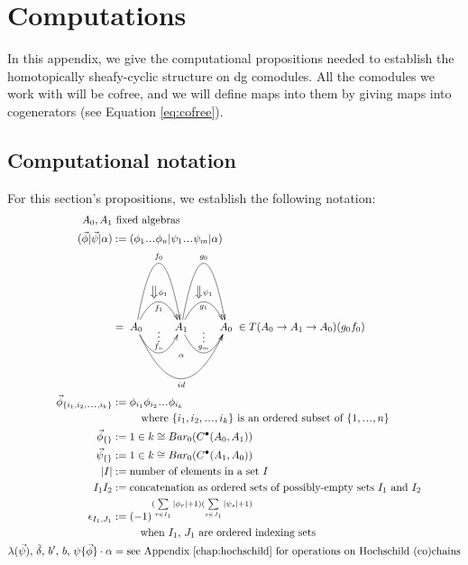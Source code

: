 \chapter{Computations}\label{chap:computations}
In this appendix, we give the 
computational propositions 
needed to establish the 
homotopically sheafy-cyclic structure 
on dg comodules. All the comodules we work 
with will be cofree, 
and we will define maps into them by 
giving maps into cogenerators 
(see Equation \ref{eq:cofree}).

\section{Computational notation} \label{sec:comp_notation_1}
For this section's propositions, we 
establish the following notation:
\begin{align*}
A_0, A_1 
&\textrm{ fixed algebras}\\
(\vec{\phi} | \vec{\psi} | \alpha) 
&:= 
(\phi_1\smdots\phi_n | \psi_1\smdots\psi_m| \alpha)\\
&= 
\xymatrix{
A_0 \ar@/^5pc/[r]^{f_0} 
\ar@/^2pc/[r]^{\big\Downarrow \phi_1}_{f_1} 
\ar@/_2pc/[r]^{\substack{\vdots\\ f_n}}
\ar@/_4pc/[rr]_{id}^{\substack{\alpha \\ \\ \\ \\ }}
& A_1 \ar@/^5pc/[r]^{g_0} 
\ar@/^2pc/[r]^{\big\Downarrow \psi_1}_{g_1} 
\ar@/_2pc/[r]^{\substack{\vdots\\ g_m}}
& A_0
}
\in T(A_0 \to A_1 \to A_0)(g_0f_0)\\
\vec{\phi}_{\{i_1, i_2,\smdots, i_k\}}
&:= 
\phi_{i_1}\phi_{i_2}\smdots\phi_{i_k}\\
&\phantom{{}move{}}
 \textrm{ where $\{i_1, i_2,\smdots, i_k\}$ 
 is an ordered subset of $\{1,\smdots,n\}$}\\
\vec{\phi}_{\{\}}
&:= 
1 \in k \cong Bar_0(C^\bullet(A_0, A_1))\\
\vec{\psi}_{\{\}}
&:= 
1 \in k \cong Bar_0(C^\bullet(A_1, A_0))\\
|I| 
&:=
\textrm{number of elements in a set $I$}\\
I_1I_2 
&:= 
\textrm{concatenation as ordered sets 
of possibly-empty sets $I_1$ and $I_2$}\\
\epsilon_{I_1,J_1} 
&:= 
(-1)^{(\sum \limits_{r \in I_1}|\phi_r|+1)
  (\sum \limits_{s \in J_1}|\psi_s|+1) }\\
&\phantom{{}:={}}  
  \quad \textrm{when $I_1$, $J_1$ are 
  ordered indexing sets}\\
\lambda({\vec{\psi}}),\, \tilde{\delta},\, 
b^\prime,\, b,\, \psi\{\vec{\phi}\}\cdot \alpha
&=
\textrm{see Appendix \ref{chap:hochschild} 
for operations on Hochschild (co)chains}\\
\end{align*}
%
